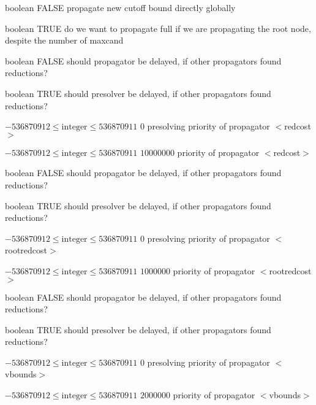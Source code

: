 %
{boolean}%
{FALSE}%
{propagate new cutoff bound directly globally}%
{}

%
{boolean}%
{TRUE}%
{do we want to propagate full if we are propagating the root node, despite the number of maxcand}%
{}

%
{boolean}%
{FALSE}%
{should propagator be delayed, if other propagators found reductions?}%
{}

%
{boolean}%
{TRUE}%
{should presolver be delayed, if other propagators found reductions?}%
{}

%
{$-536870912\leq\textrm{integer}\leq536870911$}%
{$0$}%
{presolving priority of propagator $<$redcost$>$}%
{}

%
{$-536870912\leq\textrm{integer}\leq536870911$}%
{$10000000$}%
{priority of propagator $<$redcost$>$}%
{}

%
{boolean}%
{FALSE}%
{should propagator be delayed, if other propagators found reductions?}%
{}

%
{boolean}%
{TRUE}%
{should presolver be delayed, if other propagators found reductions?}%
{}

%
{$-536870912\leq\textrm{integer}\leq536870911$}%
{$0$}%
{presolving priority of propagator $<$rootredcost$>$}%
{}

%
{$-536870912\leq\textrm{integer}\leq536870911$}%
{$1000000$}%
{priority of propagator $<$rootredcost$>$}%
{}

%
{boolean}%
{FALSE}%
{should propagator be delayed, if other propagators found reductions?}%
{}

%
{boolean}%
{TRUE}%
{should presolver be delayed, if other propagators found reductions?}%
{}

%
{$-536870912\leq\textrm{integer}\leq536870911$}%
{$0$}%
{presolving priority of propagator $<$vbounds$>$}%
{}

%
{$-536870912\leq\textrm{integer}\leq536870911$}%
{$2000000$}%
{priority of propagator $<$vbounds$>$}%
{}

